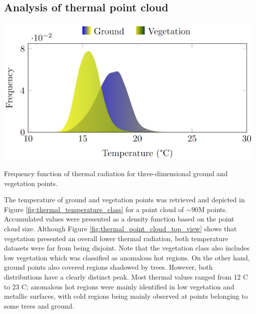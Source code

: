 \subsection{Analysis of thermal point cloud}

\begin{marginfigure}[1cm]
	\centering
	\includegraphics{figs/thermal_projection/temperature_class.png}
	\caption{Frequency function of thermal radiation for three-dimensional ground and vegetation points.}
	\label{fig:thermal_temperature_class}
\end{marginfigure}
The temperature of ground and vegetation points was retrieved and depicted in Figure \ref{fig:thermal_temperature_class} for a point cloud of $\sim90$M points. Accumulated values were presented as a density function based on the point cloud size. Although Figure \ref{fig:thermal_point_cloud_top_view} shows that vegetation presented an overall lower thermal radiation, both temperature datasets were far from being disjoint. Note that the vegetation class also includes low vegetation which was classified as anomalous hot regions. On the other hand, ground points also covered regions shadowed by trees. However, both distributions have a clearly distinct peak. Most thermal values ranged from 12 \textdegree C to 23 \textdegree C; anomalous hot regions were mainly identified in low vegetation and metallic surfaces, with cold regions being mainly observed at points belonging to some trees and ground.

